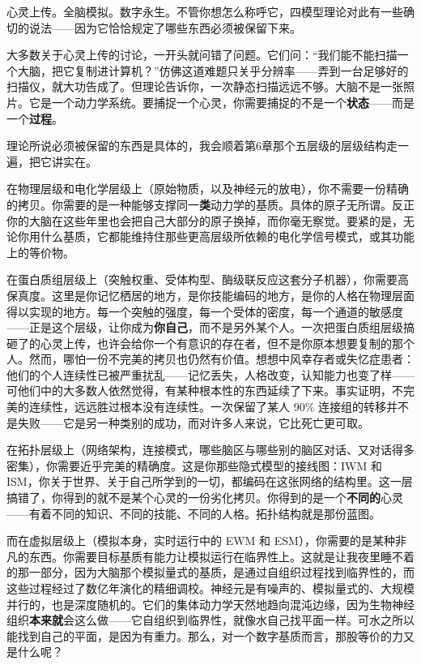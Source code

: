 \documentclass[11pt, twoside, openright]{book}
\begin{document}
心灵上传。全脑模拟。数字永生。不管你想怎么称呼它，四模型理论对此有一些确切的说法------因为它恰恰规定了哪些东西必须被保留下来。

大多数关于心灵上传的讨论，一开头就问错了问题。它们问：“我们能不能扫描一个大脑，把它复制进计算机？”仿佛这道难题只关乎分辨率------弄到一台足够好的扫描仪，就大功告成了。但理论告诉你，一次静态扫描远远不够。大脑不是一张照片。它是一个动力学系统。要捕捉一个心灵，你需要捕捉的不是一个\textbf{状态}------而是一个\textbf{过程}。

理论所说必须被保留的东西是具体的，我会顺着第6章那个五层级的层级结构走一遍，把它讲实在。

在物理层级和电化学层级上（原始物质，以及神经元的放电），你不需要一份精确的拷贝。你需要的是一种能够支撑同一\textbf{类}动力学的基质。具体的原子无所谓。反正你的大脑在这些年里也会把自己大部分的原子换掉，而你毫无察觉。要紧的是，无论你用什么基质，它都能维持住那些更高层级所依赖的电化学信号模式，或其功能上的等价物。

在蛋白质组层级上（突触权重、受体构型、酶级联反应这套分子机器），你需要高保真度。这里是你记忆栖居的地方，是你技能编码的地方，是你的人格在物理层面得以实现的地方。每一个突触的强度，每一个受体的密度，每一个通道的敏感度------正是这个层级，让你成为\textbf{你自己}，而不是另外某个人。一次把蛋白质组层级搞砸了的心灵上传，也许会给你一个有意识的存在者，但不是你原本想要复制的那个人。然而，哪怕一份不完美的拷贝也仍然有价值。想想中风幸存者或失忆症患者：他们的个人连续性已被严重扰乱------记忆丢失，人格改变，认知能力也变了样------可他们中的大多数人依然觉得，有某种根本性的东西延续了下来。事实证明，不完美的连续性，远远胜过根本没有连续性。一次保留了某人 90\% 连接组的转移并不是失败------它是另一种类别的成功，而对许多人来说，它比死亡更可取。

在拓扑层级上（网络架构，连接模式，哪些脑区与哪些别的脑区对话、又对话得多密集），你需要近乎完美的精确度。这是你那些隐式模型的接线图：IWM 和 ISM，你关于世界、关于自己所学到的一切，都编码在这张网络的结构里。这一层搞错了，你得到的就不是某个心灵的一份劣化拷贝。你得到的是一个\textbf{不同的}心灵------有着不同的知识、不同的技能、不同的人格。拓扑结构就是那份蓝图。

而在虚拟层级上（模拟本身，实时运行中的 EWM 和 ESM），你需要的是某种非凡的东西。你需要目标基质有能力让模拟运行在临界性上。这就是让我夜里睡不着的那一部分，因为大脑那个模拟量式的基质，是通过自组织过程找到临界性的，而这些过程经过了数亿年演化的精细调校。神经元是有噪声的、模拟量式的、大规模并行的，也是深度随机的。它们的集体动力学天然地趋向混沌边缘，因为生物神经组织\textbf{本来就}会这么做------它自组织到临界性，就像水自己找平面一样。可水之所以能找到自己的平面，是因为有重力。那么，对一个数字基质而言，那股等价的力又是什么呢？
\end{document}
